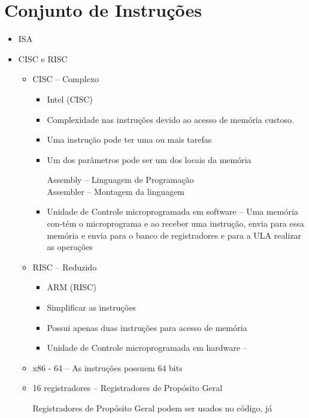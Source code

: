 \documentclass[12pt]{article}
\begin{document}
\section{Conjunto de Instruções}
\begin{itemize}
    \item ISA
    \item CISC e RISC
    \begin{itemize}
        \item CISC -- Complexo
        \begin{itemize}
            \item Intel (CISC)
            \item Complexidade nas instruções devido ao acesso de memória 
            custoso.
            \item Uma instrução pode ter uma ou mais tarefas
            \item Um dos parâmetros pode ser um dos locais da memória \\ 
            \begin{scriptsize}
                Assembly -- Linguagem de Programação\\
                Assembler -- Montagem da linguagem
            \end{scriptsize}
            \item Unidade de Controle microprogramada em software -- Uma memória 
            con-tém o microprograma e ao receber uma instrução, envia para essa 
            memória e envia para o banco de registradores e para a ULA realizar 
            as operações
        \end{itemize}
        \item RISC -- Reduzido
        \begin{itemize}
            \item ARM (RISC)
            \item Simplificar as instruções
            \item Possui apenas duas instruções para acesso de memória
            \item Unidade de Controle microprogramada em hardware -- 
        \end{itemize}        
        \item x86 - 64 -- As instruções possuem 64 bits
        \item 16 registradores -- Registradores de Propósito Geral\\
        \begin{scriptsize}
            Registradores de Propósito Geral podem ser usados no código, já 

\end{scriptsize}
\end{itemize}
\end{itemize}
\end{document}
